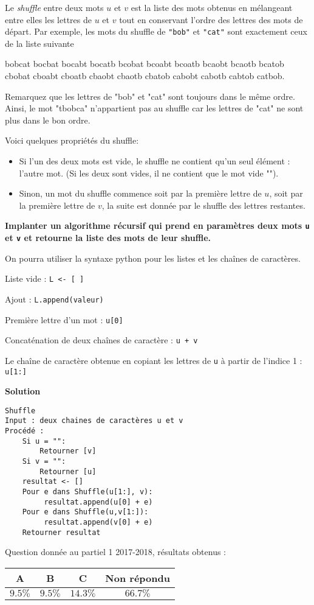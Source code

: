 
\begin{exercice}[Partiel 2017-18]
Le \textit{shuffle} entre deux mots $u$ et $v$ est la liste des mots obtenus en mélangeant entre elles les lettres de $u$ et $v$ tout en conservant l'ordre des lettres des mots de départ. Par exemple, les mots du shuffle de {\tt "bob"} et {\tt "cat"} sont exactement ceux de la liste suivante

bobcat bocbat bocabt bocatb bcobat bcoabt bcoatb bcaobt bcaotb bcatob cbobat cboabt cboatb cbaobt cbaotb cbatob cabobt cabotb cabtob catbob.

Remarquez que les lettres de "bob" et "cat" sont toujours dans le même ordre. Ainsi, le mot "tbobca" n'appartient pas au shuffle car les lettres de "cat" ne sont plus dans le bon ordre.

 Voici quelques propriétés du shuffle:

\begin{itemize}
\item Si l'un des deux mots est vide, le shuffle ne contient qu'un seul élément : l'autre mot. (Si les deux sont vides, il ne contient que le mot vide "").

\item Sinon, un mot du shuffle commence soit par la première lettre de $u$, soit par la première lettre de $v$, la suite est donnée par le shuffle des lettres restantes. 
\end{itemize}

\textbf{Implanter un algorithme récursif qui prend en paramètres deux mots {\tt u} et {\tt v} et retourne la liste des mots de leur shuffle.}

On pourra utiliser la syntaxe python pour les listes et les chaînes de caractères.

Liste vide : {\tt L <- [ ]}

Ajout : {\tt L.append(valeur)}

Première lettre d'un mot : {\tt u[0]}

Concaténation de deux chaînes de caractère : {\tt u + v}

Le chaîne de caractère obtenue en copiant les lettres de {\tt u} à partir de l'indice 1 : {\tt u[1:]}

\textbf{Solution}

\vspace{0.5cm}

\begin{lstlisting}
Shuffle
Input : deux chaines de caractères u et v
Procédé :
    Si u = "":
        Retourner [v]
    Si v = "":
        Retourner [u]
    resultat <- []
    Pour e dans Shuffle(u[1:], v):
         resultat.append(u[0] + e)
    Pour e dans Shuffle(u,v[1:]):
         resultat.append(v[0] + e)
    Retourner resultat 
\end{lstlisting}



Question donnée au partiel 1 2017-2018, résultats obtenus :

\begin{tabular}{|c|c|c|c|}
\hline
A & B & C & Non répondu  \\ \hline
$9.5\%$ & $9.5\%$ & $14.3\%$ & $66.7\%$ \\ \hline
\end{tabular} 

\end{exercice}